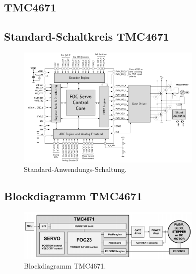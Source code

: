 \begin{appendix} 

\section{TMC4671}\label{Appendix:TMC4671}

\subsection{Standard-Schaltkreis TMC4671}

\begin{figure}[h!]
	\centering
	\includegraphics[width=0.8\textwidth]{graphics/Standard_Application_Cirquit_TMC4671}
	\caption{Standard-Anwendungs-Schaltung.}
	\label{fig:Schaltung_TMC4671}
\end{figure}

\subsection{Blockdiagramm TMC4671}

\begin{figure}[h!]
	\centering
	\includegraphics[width=0.8\textwidth]{graphics/Blockdiagramm_TMC4671}
	\caption{Blockdiagramm TMC4671.}
	\label{fig:Blockdiagramm_TMC4671}
\end{figure}


\newpage


\end{appendix}
